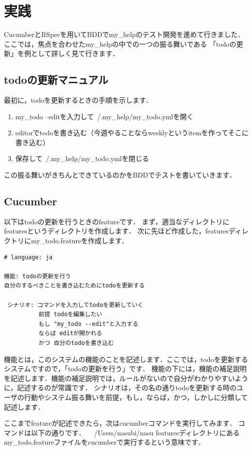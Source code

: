 
\section{実践}
CucumberとRSpecを用いてBDDでmy\_helpのテスト開発を進めて行きました．
ここでは，焦点を合わせたmy\_helpの中での一つの振る舞いである
「todoの更新」を例として詳しく見て行きます．

\subsection{todoの更新マニュアル}
最初に，todoを更新するときの手順を示します．

\begin{enumerate}
\item my\_todo --editを入力して~/.my\_help/my\_todo.ymlを開く
\item editorでtodoを書き込む（今週やることならweeklyというitemを作ってそこに書き込む）
\item 保存して~/.my\_help/my\_todo.ymlを閉じる
\end{enumerate}
この振る舞いがきちんとできているのかをBDDでテストを書いていきます．

\subsection{Cucumber}
以下はtodoの更新を行うときのfeatureです．
まず，適当なディレクトリにfeaturesというディレクトリを作成します．
次に先ほど作成した，featuresディレクトリにmy\_todo.featureを作成します．
\begin{lstlisting}[style=customCsh]
# language: ja 

機能: todoの更新を行う
自分のするべきことを書き込むためにtodoを更新する

 シナリオ: コマンドを入力してtodoを更新していく
          前提 todoを編集したい
          もし "my_todo --edit"と入力する
          ならば editが開かれる
          かつ 自分のtodoを書き込む
\end{lstlisting}
機能とは，このシステムの機能のことを記述します．ここでは，todoを更新するシステムですので，「todoの更新を行う」です．
機能の下には，機能の補足説明を記述します．機能の補足説明では，ルールがないので自分がわかりやすいように，記述するのが常識です．
シナリオは，その名の通りtodoを更新する時のユーザの行動やシステム振る舞いを前提，もし，ならば，かつ，しかしに分類して記述します．

ここまでfeatureが記述できたら，次はcucumberコマンドを実行してみます．
コマンドは以下の通りです．
　/Users/nasubi/nasu%
featuresディレクトリにあるmy\_todo.featureファイルをcucumberで実行するという意味です．

